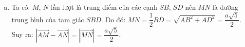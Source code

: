 \begin{ex}
{\begin{enumerate}[a)]
			      Lại có: $M$ là trung điểm của $SB$ nên $MB=\dfrac{1}{2}SB=\dfrac{a\sqrt{5}}{2}$. \\
			      Ta tính được: $\cos \widehat{MAB}=\dfrac{MA^2+AB^2-MB^2}{2MA \cdot AB}=\dfrac{\sqrt{5}}{5}$.\\
			      Mà: $\left(\vec{AM},\vec{AB}\right)=\widehat{MAB}$, suy ra: \\
			      $\vec{AM}\cdot \vec{AB}=\left| \vec{AM} \right| \cdot \left| \vec{AB} \right| \cdot \cos \left(\vec{AM},\vec{AB}\right)=\dfrac{a\sqrt{5}}{2} \cdot a \cdot \dfrac{\sqrt{5}}{5}=\dfrac{a^2}{2}$.
			\item Ta có: $M$, $N$ lần lượt là trung điểm của các cạnh $SB$, $SD$ nên $MN$ là đường trung bình của tam giác $SBD$.
			      Do đó: $MN=\dfrac{1}{2}BD=\sqrt{AB^2+AD^2}=\dfrac{a\sqrt{5}}{2}$.\\
			      Suy ra: $\left| \vec{AM}-\vec{AN} \right| =\left| \vec{MN} \right| =\dfrac{a\sqrt{5}}{2}$.
		\end{enumerate}
	}
\end{ex}
